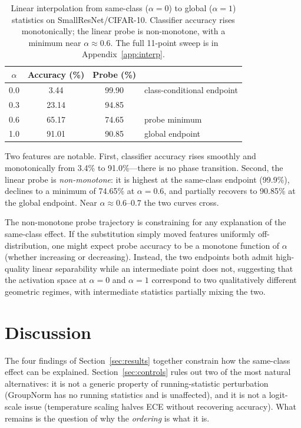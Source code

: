 \documentclass{article}
\begin{document}
\begin{table}[t]
\caption{Linear interpolation from same-class ($\alpha=0$) to global ($\alpha=1$) statistics on SmallResNet/CIFAR-10. Classifier accuracy rises monotonically; the linear probe is non-monotone, with a minimum near $\alpha\approx 0.6$. The full 11-point sweep is in Appendix~\ref{app:interp}.}
\label{tab:interp}
\centering
\small
\begin{tabular}{@{}cccl@{}}
\toprule
$\alpha$ & Accuracy (\%) & Probe (\%) & \\
\midrule
0.0 & 3.44  & 99.90 & class-conditional endpoint \\
0.3 & 23.14 & 94.85 & \\
0.6 & 65.17 & 74.65 & probe minimum \\
1.0 & 91.01 & 90.85 & global endpoint \\
\bottomrule
\end{tabular}
\end{table}

Two features are notable. First, classifier accuracy rises smoothly and monotonically from 3.4\% to 91.0\%---there is no phase transition. Second, the linear probe is \emph{non-monotone}: it is highest at the same-class endpoint (99.9\%), declines to a minimum of 74.65\% at $\alpha=0.6$, and partially recovers to 90.85\% at the global endpoint. Near $\alpha\approx 0.6$--$0.7$ the two curves cross.

The non-monotone probe trajectory is constraining for any explanation of the same-class effect. If the substitution simply moved features uniformly off-distribution, one might expect probe accuracy to be a monotone function of $\alpha$ (whether increasing or decreasing). Instead, the two endpoints both admit high-quality linear separability while an intermediate point does not, suggesting that the activation space at $\alpha=0$ and $\alpha=1$ correspond to two qualitatively different geometric regimes, with intermediate statistics partially mixing the two.

\section{Discussion}
\label{sec:discussion}

The four findings of Section~\ref{sec:results} together constrain how the same-class effect can be explained. Section~\ref{sec:controls} rules out two of the most natural alternatives: it is not a generic property of running-statistic perturbation (GroupNorm has no running statistics and is unaffected), and it is not a logit-scale issue (temperature scaling halves ECE without recovering accuracy). What remains is the question of why the \emph{ordering} is what it is.
\end{document}
